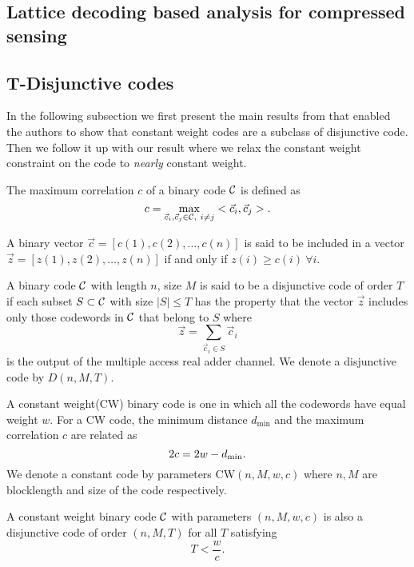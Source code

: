 \subsection{Lattice decoding based analysis for compressed sensing}
\label{appendix:cs_analysis2}


\subsection{T-Disjunctive codes}
\label{appendix:disjunctive}
In the following subsection we first present the main results from \cite{fan1995superimposed} that enabled the authors to show that constant weight codes are a subclass of disjunctive code. Then we follow it up with our result where we relax the constant weight constraint on the code to \textit{nearly} constant weight.
\begin{definition}
The maximum correlation $c$ of a binary code $\mathcal{C}$ is defined as
\[
c=\max_{\vec{c}_i,\vec{c}_j\in \mathcal{C},~i\neq j} < \vec{c}_i,\vec{c}_j>.
\]
\end{definition}

\begin{definition}
A binary vector $\vec{c}=[c(1),c(2),\ldots,c(n)]$ is said to be included in a vector  $\vec{z}=[z(1),z(2),\ldots,z(n)]$ if and only if $z(i)\geq c(i)~\forall i$.
\end{definition}

\begin{definition}
A binary code $\mathcal{C}$ with length $n$, size $M$ is said to be a disjunctive code of order $T$ if each subset $S\subset \mathcal{C}$ with size $|S|\leq T$ has the property that the vector $\vec{z}$ includes only those codewords in $\mathcal{C}$ that belong to $S$ where
\begin{equation}
\vec{z}=\sum_{\vec{c}_i\in S}\vec{c}_i
\label{eqn:mac_adder}
\end{equation}
is the output of the multiple access real adder channel. We denote a disjunctive code by $D(n,M,T)$.
\end{definition}

\begin{definition}
A constant weight(CW) binary code is one in which all the codewords have equal weight $w$. For a CW code, the minimum distance $d_{\text{min}}$ and the maximum correlation $c$ are related as
\[
2c=2w-d_{\mathrm{min}}.
\]
We denote a constant code by parameters CW$(n,M,w,c)$ where $n, M$ are blocklength and size of the code respectively.
\end{definition}
\begin{lemma}
\label{lem:fandisjunctive_code}
A constant weight binary code $\mathcal{C}$ with parameters $(n,M,w,c)$ is also a disjunctive code of order $(n,M,T)$ for all $T$ satisfying
\[
T<\frac{w}{c}.
\]
\end{lemma}

